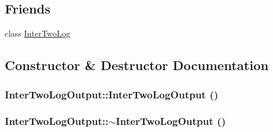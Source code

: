 \subsection*{Friends}
\begin{DoxyCompactItemize}
\item 
class \hyperlink{classInterTwoLogOutput_a3e7fc64b26065625ba57d692b5e411ca}{InterTwoLog}
\end{DoxyCompactItemize}


\subsection{Constructor \& Destructor Documentation}
\hypertarget{classInterTwoLogOutput_a22e75592762dfde6d82bc911aa810354}{
\subsubsection[{InterTwoLogOutput}]{\setlength{\rightskip}{0pt plus 5cm}InterTwoLogOutput::InterTwoLogOutput ()}}
\label{classInterTwoLogOutput_a22e75592762dfde6d82bc911aa810354}
\hypertarget{classInterTwoLogOutput_a6e6f407ccb2ae032b2758f9d1331a798}{
\subsubsection[{$\sim$InterTwoLogOutput}]{\setlength{\rightskip}{0pt plus 5cm}InterTwoLogOutput::$\sim$InterTwoLogOutput ()}}
\label{classInterTwoLogOutput_a6e6f407ccb2ae032b2758f9d1331a798}


